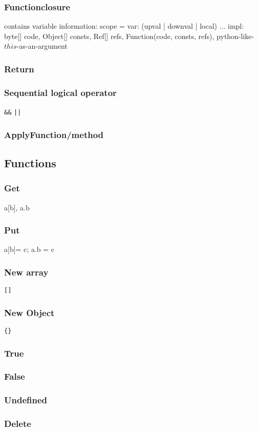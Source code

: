 \subsubsection{Functionclosure}
contains variable information: scope = {var: (upval | downval | local) ... }
impl: byte[] code, Object[] consts, Ref[] refs, Function(code, consts, refs), 
python-like-$this$-as-an-argument
\subsubsection{Return}
\subsubsection{Sequential logical operator}
\verb|&&| \verb#||#
\subsubsection{ApplyFunction/method}

\subsection{Functions}
\subsubsection{Get}
a[b], a.b
\subsubsection{Put}
a[b]= c; a.b = c
\subsubsection{New array}
\verb|[]|
\subsubsection{New Object}
\verb|{}|
\subsubsection{True}
\subsubsection{False}
\subsubsection{Undefined}
\subsubsection{Delete}
